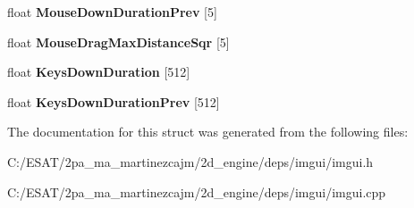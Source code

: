 \begin{DoxyCompactItemize}
\item 
\mbox{\label{struct_im_gui_i_o_a59d19cf7ad831e57ce15f90295871881}} 
float {\bfseries Mouse\+Down\+Duration\+Prev} \mbox{[}5\mbox{]}
\item 
\mbox{\label{struct_im_gui_i_o_a86c7fe77349fd82a60ab7a279aa27f01}} 
float {\bfseries Mouse\+Drag\+Max\+Distance\+Sqr} \mbox{[}5\mbox{]}
\item 
\mbox{\label{struct_im_gui_i_o_a6f1da2ea6d8e3398d9526fe983cf0a6f}} 
float {\bfseries Keys\+Down\+Duration} \mbox{[}512\mbox{]}
\item 
\mbox{\label{struct_im_gui_i_o_ac079dcd415784a08fec74388e18abb97}} 
float {\bfseries Keys\+Down\+Duration\+Prev} \mbox{[}512\mbox{]}
\end{DoxyCompactItemize}


The documentation for this struct was generated from the following files\+:\begin{DoxyCompactItemize}
\item 
C\+:/\+E\+S\+A\+T/2pa\+\_\+ma\+\_\+martinezcajm/2d\+\_\+engine/deps/imgui/imgui.\+h\item 
C\+:/\+E\+S\+A\+T/2pa\+\_\+ma\+\_\+martinezcajm/2d\+\_\+engine/deps/imgui/imgui.\+cpp\end{DoxyCompactItemize}
